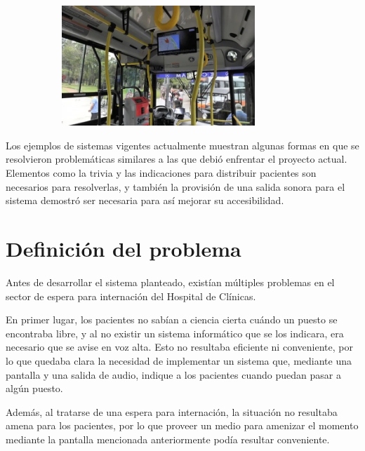 \documentclass{article}
\begin{document}
\begin{figure}[H]
	\caption{Colectivo con pantalla que muestra información relevante}
    \begin{subfigure}{1.0\textwidth}
	\includegraphics[width=0.8\textwidth]{colectivo.png}
    \end{subfigure}
	\label{fig:colectivo}
\end{figure}
\vspace{-1.0\baselineskip}
Los ejemplos de sistemas vigentes actualmente muestran algunas formas en que se resolvieron problemáticas similares a las que debió enfrentar el proyecto actual. Elementos como la trivia y las indicaciones para distribuir pacientes son necesarios para resolverlas, y también la provisión de una salida sonora para el sistema demostró ser necesaria para así mejorar su accesibilidad.
\newpage
\section{Definición del problema}
Antes de desarrollar el sistema planteado, existían múltiples problemas en el sector de espera para internación del Hospital de Clínicas.

En primer lugar, los pacientes no sabían a ciencia cierta cuándo un puesto se encontraba libre, y al no existir un sistema informático que se los indicara, era necesario que se avise en voz alta. Esto no resultaba eficiente ni conveniente, por lo que quedaba clara la necesidad de implementar un sistema que, mediante una pantalla y una salida de audio, indique a los pacientes cuando puedan pasar a algún puesto.

Además, al tratarse de una espera para internación, la situación no resultaba amena para los pacientes, por lo que proveer un medio para amenizar el momento mediante la pantalla mencionada anteriormente podía resultar conveniente.
\end{document}
